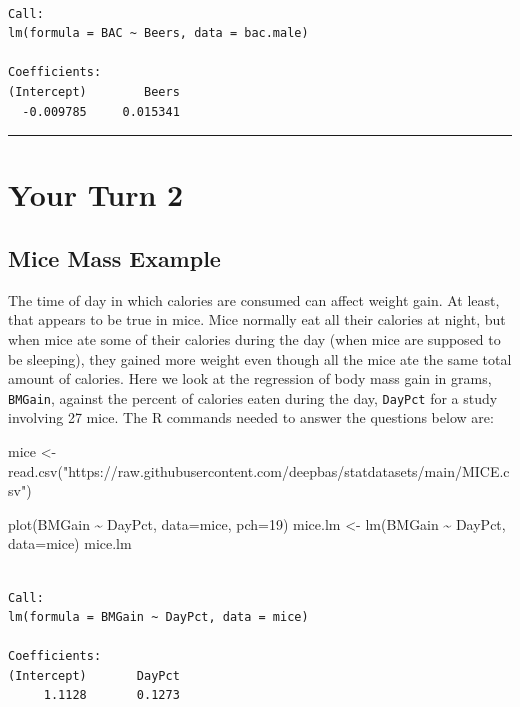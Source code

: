 \documentclass[
]{book}
\newenvironment{Shaded}{\begin{snugshade}}{\end{snugshade}}
\newcommand{\AttributeTok}[1]{\textcolor[rgb]{0.77,0.63,0.00}{#1}}
\newcommand{\DecValTok}[1]{\textcolor[rgb]{0.00,0.00,0.81}{#1}}
\newcommand{\FunctionTok}[1]{\textcolor[rgb]{0.00,0.00,0.00}{#1}}
\newcommand{\NormalTok}[1]{#1}
\newcommand{\OtherTok}[1]{\textcolor[rgb]{0.56,0.35,0.01}{#1}}
\newcommand{\SpecialCharTok}[1]{\textcolor[rgb]{0.00,0.00,0.00}{#1}}
\newcommand{\StringTok}[1]{\textcolor[rgb]{0.31,0.60,0.02}{#1}}
\begin{document}
\begin{verbatim}

Call:
lm(formula = BAC ~ Beers, data = bac.male)

Coefficients:
(Intercept)        Beers  
  -0.009785     0.015341  
\end{verbatim}

\begin{center}\rule{0.5\linewidth}{0.5pt}\end{center}

\hypertarget{your-turn-2-4}{%
\section{Your Turn 2}\label{your-turn-2-4}}

\hypertarget{mice-mass-example}{%
\subsection{Mice Mass Example}\label{mice-mass-example}}

The time of day in which calories are consumed can affect weight gain. At least, that appears to be true in mice. Mice normally eat all their calories at night, but when mice ate some of their calories during the day (when mice are supposed to be sleeping), they gained more weight even though all the mice ate the same total amount of calories. Here we look at the regression of body mass gain in grams, \texttt{BMGain}, against the percent of calories eaten during the day, \texttt{DayPct} for a study involving 27 mice. The R commands needed to answer the questions below are:

\begin{Shaded}
\begin{Highlighting}[]
\NormalTok{mice }\OtherTok{\textless{}{-}} \FunctionTok{read.csv}\NormalTok{(}\StringTok{"https://raw.githubusercontent.com/deepbas/statdatasets/main/MICE.csv"}\NormalTok{)}
  
\FunctionTok{plot}\NormalTok{(BMGain }\SpecialCharTok{\textasciitilde{}}\NormalTok{ DayPct, }\AttributeTok{data=}\NormalTok{mice, }\AttributeTok{pch=}\DecValTok{19}\NormalTok{)}
\NormalTok{mice.lm }\OtherTok{\textless{}{-}} \FunctionTok{lm}\NormalTok{(BMGain }\SpecialCharTok{\textasciitilde{}}\NormalTok{ DayPct, }\AttributeTok{data=}\NormalTok{mice)}
\NormalTok{mice.lm}
\end{Highlighting}
\end{Shaded}

\begin{verbatim}

Call:
lm(formula = BMGain ~ DayPct, data = mice)

Coefficients:
(Intercept)       DayPct  
     1.1128       0.1273  
\end{verbatim}
\end{document}
